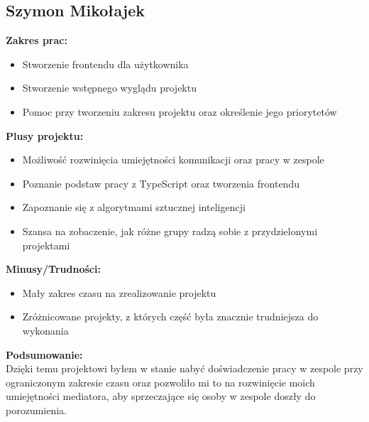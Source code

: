 \documentclass[12pt,a4paper]{article}
\begin{document}
\subsection{Szymon Mikołajek}
\textbf{Zakres prac:}
\begin{itemize}
    \item Stworzenie frontendu dla użytkownika
    \item Stworzenie wstępnego wyglądu projektu
    \item Pomoc przy tworzeniu zakresu projektu oraz określenie jego priorytetów
\end{itemize}
\textbf{Plusy projektu:} 
\begin{itemize}
    \item Możliwość rozwinięcia umiejętności komunikacji oraz pracy w zespole
    \item Poznanie podstaw pracy z TypeScript oraz tworzenia frontendu
    \item Zapoznanie się z algorytmami sztucznej inteligencji
    \item Szansa na zobaczenie, jak różne grupy radzą sobie z przydzielonymi projektami
\end{itemize}
\textbf{Minusy/Trudności:} 
\begin{itemize}
    \item Mały zakres czasu na zrealizowanie projektu
    \item Zróżnicowane projekty, z których część była znacznie trudniejsza do wykonania
\end{itemize}
\textbf{Podsumowanie:} \\
Dzięki temu projektowi byłem w stanie nabyć doświadczenie pracy w zespole przy ograniczonym zakresie czasu oraz pozwoliło mi to na rozwinięcie moich umiejętności mediatora, aby sprzeczające się osoby w zespole doszły do porozumienia.
\end{document}
